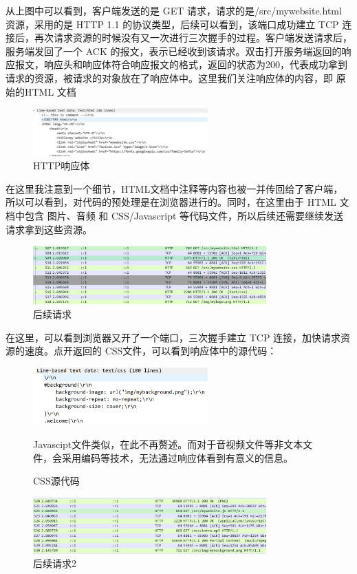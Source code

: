 \documentclass[UTF8,a4paper,10pt]{ctexart}
\begin{document}
从上图中可以看到，客户端发送的是 GET 请求，请求的是/src/mywebsite.html 资源，采用的是 HTTP 1.1 的协议类型，后续可以看到，该端口成功建立 TCP 连接后，再次请求资源的时候没有又一次进行三次握手的过程。客户端发送请求后，服务端发回了一个 ACK 的报文，表示已经收到该请求。双击打开服务端返回的响应报文，响应头和响应体符合响应报文的格式，返回的状态为200，代表成功拿到请求的资源，被请求的对象放在了响应体中。这里我们关注响应体的内容，即 原始的HTML 文档
\begin{figure}[H]
    \centering
\includegraphics[width=0.6\textwidth]{img/HTTP响应体.png}
    \caption{HTTP响应体}
\end{figure}
在这里我注意到一个细节，HTML文档中注释等内容也被一并传回给了客户端，所以可以看到，对代码的预处理是在浏览器进行的。同时，在这里由于 HTML 文档中包含 图片、音频 和 CSS/Javascript 等代码文件，所以后续还需要继续发送请求拿到这些资源。
\begin{figure}[H]
    \centering
\includegraphics[width=0.8\textwidth]{img/后续请求.png}
    \caption{后续请求}
\end{figure}
在这里，可以看到浏览器又开了一个端口，三次握手建立 TCP 连接，加快请求资源的速度。点开返回的 CSS文件，可以看到响应体中的源代码：
\begin{figure}[H]
    \centering
\includegraphics[width=0.6\textwidth]{img/CSS源代码.png}
    \caption{CSS源代码}
Javascipt文件类似，在此不再赘述。而对于音视频文件等非文本文件，会采用编码等技术，无法通过响应体看到有意义的信息。
\end{figure}
\begin{figure}[H]
    \centering
\includegraphics[width=0.8\textwidth]{img/后续请求2.png}
    \caption{后续请求2}
\end{figure}
\end{document}
